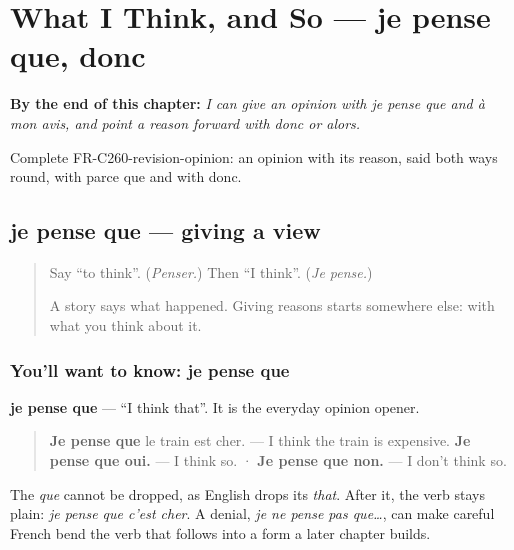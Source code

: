 
\chapter{What I Think, and So — je pense que, donc}
\label{ch:fr-what-i-think}

\begin{chapteropening}
\textbf{By the end of this chapter:} \emph{I can give an opinion with je pense que and à mon avis, and point a reason forward with donc or alors.}

Complete FR-C260-revision-opinion: an opinion with its reason, said both ways round, with parce que and with donc.
\end{chapteropening}

\section[je pense que, à mon avis]{je pense que — giving a view}

\label{lesson:FR-C260-je-pense-que}



\begin{quote}
Say \textquotedblleft{}to think\textquotedblright{}. (\emph{Penser.}) Then \textquotedblleft{}I think\textquotedblright{}. (\emph{Je pense.})

A story says what happened. Giving reasons starts somewhere else: with what you think about it.
\end{quote}

\subsection*{You'll want to know: je pense que}
\textbf{je pense que} — \textquotedblleft{}I think that\textquotedblright{}. It is the everyday opinion opener.

\begin{quote}
\textbf{Je pense que} le train est cher. — I think the train is expensive. \textbf{Je pense que oui.} — I think so. · \textbf{Je pense que non.} — I don't think so.
\end{quote}

The \emph{que} cannot be dropped, as English drops its \emph{that}. After it, the verb stays plain: \emph{je pense que c'est cher}. A denial, \emph{je ne pense pas que…}, can make careful French bend the verb that follows into a form a later chapter builds.

